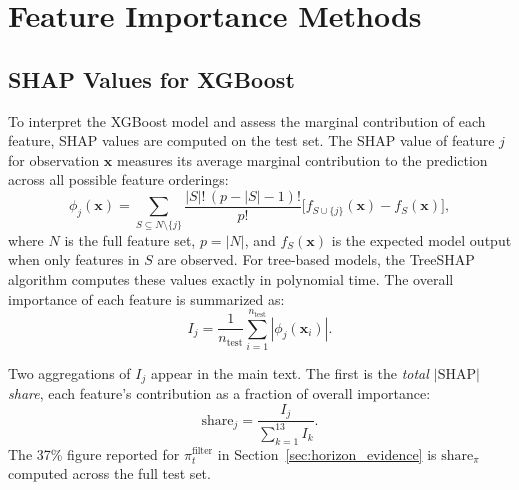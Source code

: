 \section{Feature Importance Methods}

\subsection{SHAP Values for XGBoost}\label{app:shap}

To interpret the XGBoost model and assess the marginal contribution of each feature, SHAP values \citep{Lundberg2017} are computed on the test set. The SHAP value of feature $j$ for observation $\mathbf{x}$ measures its average marginal contribution to the prediction across all possible feature orderings:
\begin{equation}
    \phi_j(\mathbf{x}) = \sum_{S \subseteq N \setminus \{j\}} \frac{|S|!\,(p - |S| - 1)!}{p!} \Big[f_{S \cup \{j\}}(\mathbf{x}) - f_S(\mathbf{x})\Big],
\end{equation}
where $N$ is the full feature set, $p = |N|$, and $f_S(\mathbf{x})$ is the expected model output when only features in $S$ are observed. For tree-based models, the TreeSHAP algorithm \citep{Lundberg2020} computes these values exactly in polynomial time. The overall importance of each feature is summarized as:
\begin{equation}
    I_j = \frac{1}{n_{\text{test}}} \sum_{i=1}^{n_{\text{test}}} |\phi_j(\mathbf{x}_i)|.
\end{equation}

Two aggregations of $I_j$ appear in the main text. The first is the \emph{total $|\text{SHAP}|$ share}, each feature's contribution as a fraction of overall importance:
\begin{equation}
    \text{share}_j = \frac{I_j}{\sum_{k=1}^{13} I_k}.
\end{equation}
The 37\% figure reported for $\pi_t^{\text{filter}}$ in Section~\ref{sec:horizon_evidence} is $\text{share}_{\pi}$ computed across the full test set.

